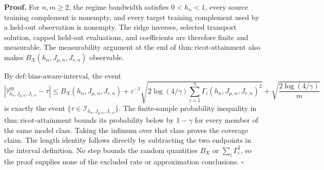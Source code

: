 \textbf{Proof.}
For \(n,m\ge2\), the regime bandwidth satisfies \(0<h_n<1\), every source training complement is nonempty, and every target training complement used by a held-out observation is nonempty. The ridge inverses, selected transport solution, capped held-out evaluations, and coefficients are therefore finite and measurable. The measurability argument at the end of \(\mathrm{thm:ricot\text{-}attainment}\) also makes \(B_X(h_n,J_{\mu,n},J_{r,n})\) observable.

By \(\mathrm{def:bias\text{-}aware\text{-}interval}\), the event
\[
\left|\widehat\tau^{\mathrm{sp}}_{h_n,J_{\mu,n},J_{r,n}}-\tau\right|
\le B_X(h_n,J_{\mu,n},J_{r,n})
+\varepsilon^{-1}\sqrt{2\log(4/\gamma)\sum_{i=1}^n\Gamma_i(h_n,J_{\mu,n},J_{r,n})^2}
+\sqrt{\frac{2\log(4/\gamma)}m}
\]
is exactly the event \(\{\tau\in\mathcal I_{h_n,J_{\mu,n},J_{r,n}}\}\). The finite-sample probability inequality in \(\mathrm{thm:ricot\text{-}attainment}\) bounds its probability below by \(1-\gamma\) for every member of the same model class. Taking the infimum over that class proves the coverage claim. The length identity follows directly by subtracting the two endpoints in the interval definition. No step bounds the random quantities \(B_X\) or \(\sum_i\Gamma_i^2\), so the proof supplies none of the excluded rate or approximation conclusions. \(\square\)